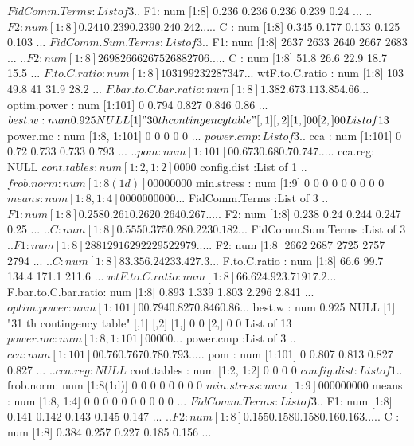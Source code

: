 \documentclass[11pt]{article} %
\begin{document}
\begin{Schunk}
\begin{Soutput}
 $ FidComm.Terms       :List of 3
  ..$ F1: num [1:8] 0.236 0.236 0.236 0.239 0.24 ...
  ..$ F2: num [1:8] 0.241 0.239 0.239 0.24 0.242 ...
  ..$ C : num [1:8] 0.345 0.177 0.153 0.125 0.103 ...
 $ FidComm.Sum.Terms   :List of 3
  ..$ F1: num [1:8] 2637 2633 2640 2667 2683 ...
  ..$ F2: num [1:8] 2698 2666 2675 2688 2706 ...
  ..$ C : num [1:8] 51.8 26.6 22.9 18.7 15.5 ...
 $ F.to.C.ratio        : num [1:8] 103 199 232 287 347 ...
 $ wtF.to.C.ratio      : num [1:8] 103 49.8 41 31.9 28.2 ...
 $ F.bar.to.C.bar.ratio: num [1:8] 1.38 2.67 3.11 3.85 4.66 ...
 $ optim.power         : num [1:101] 0 0.794 0.827 0.846 0.86 ...
 $ best.w              : num 0.925
NULL
[1] "30 th contingency table"
     [,1] [,2]
[1,]    0    0
[2,]    0    0
List of 13
 $ power.mc            : num [1:8, 1:101] 0 0 0 0 0 ...
 $ power.cmp           :List of 3
  ..$ cca    : num [1:101] 0 0.72 0.733 0.733 0.793 ...
  ..$ pom    : num [1:101] 0 0.673 0.68 0.7 0.747 ...
  ..$ cca.reg: NULL
 $ cont.tables         : num [1:2, 1:2] 0 0 0 0
 $ config.dist         :List of 1
  ..$ frob.norm: num [1:8(1d)] 0 0 0 0 0 0 0 0
 $ min.stress          : num [1:9] 0 0 0 0 0 0 0 0 0
 $ means               : num [1:8, 1:4] 0 0 0 0 0 0 0 0 0 0 ...
 $ FidComm.Terms       :List of 3
  ..$ F1: num [1:8] 0.258 0.261 0.262 0.264 0.267 ...
  ..$ F2: num [1:8] 0.238 0.24 0.244 0.247 0.25 ...
  ..$ C : num [1:8] 0.555 0.375 0.28 0.223 0.182 ...
 $ FidComm.Sum.Terms   :List of 3
  ..$ F1: num [1:8] 2881 2916 2922 2952 2979 ...
  ..$ F2: num [1:8] 2662 2687 2725 2757 2794 ...
  ..$ C : num [1:8] 83.3 56.2 42 33.4 27.3 ...
 $ F.to.C.ratio        : num [1:8] 66.6 99.7 134.4 171.1 211.6 ...
 $ wtF.to.C.ratio      : num [1:8] 66.6 24.9 23.7 19 17.2 ...
 $ F.bar.to.C.bar.ratio: num [1:8] 0.893 1.339 1.803 2.296 2.841 ...
 $ optim.power         : num [1:101] 0 0.794 0.827 0.846 0.86 ...
 $ best.w              : num 0.925
NULL
[1] "31 th contingency table"
     [,1] [,2]
[1,]    0    0
[2,]    0    0
List of 13
 $ power.mc            : num [1:8, 1:101] 0 0 0 0 0 ...
 $ power.cmp           :List of 3
  ..$ cca    : num [1:101] 0 0.76 0.767 0.78 0.793 ...
  ..$ pom    : num [1:101] 0 0.807 0.813 0.827 0.827 ...
  ..$ cca.reg: NULL
 $ cont.tables         : num [1:2, 1:2] 0 0 0 0
 $ config.dist         :List of 1
  ..$ frob.norm: num [1:8(1d)] 0 0 0 0 0 0 0 0
 $ min.stress          : num [1:9] 0 0 0 0 0 0 0 0 0
 $ means               : num [1:8, 1:4] 0 0 0 0 0 0 0 0 0 0 ...
 $ FidComm.Terms       :List of 3
  ..$ F1: num [1:8] 0.141 0.142 0.143 0.145 0.147 ...
  ..$ F2: num [1:8] 0.155 0.158 0.158 0.16 0.163 ...
  ..$ C : num [1:8] 0.384 0.257 0.227 0.185 0.156 ...

\end{Soutput}
\end{Schunk}
\end{document}
